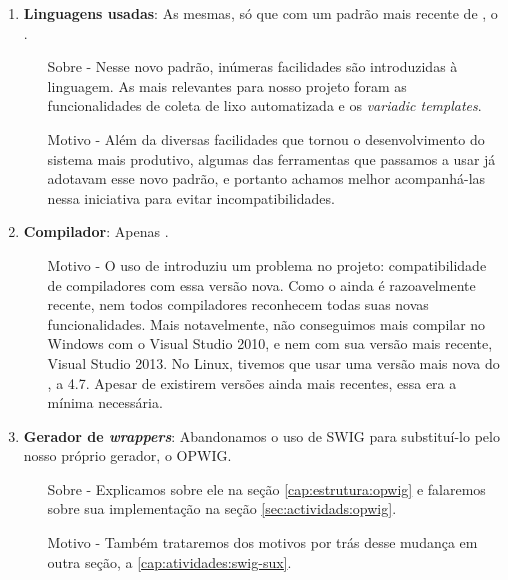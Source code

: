   \begin{enumerate}

    \item \textbf{Linguagens usadas}: As mesmas, só que com um padrão mais
      recente de \CXX{}, o .
      \begin{itemize}
        \item[Sobre -] Nesse novo padrão, inúmeras facilidades são
          introduzidas à linguagem. As mais relevantes para nosso projeto
          foram as funcionalidades de coleta de lixo automatizada e
          os \textit{variadic templates}.
        \item[Motivo -] Além da diversas facilidades que tornou o
          desenvolvimento do sistema mais produtivo, algumas das
          ferramentas que passamos a usar já adotavam esse novo padrão,
          e portanto achamos melhor acompanhá-las nessa iniciativa para
          evitar incompatibilidades.
      \end{itemize}

    \item \textbf{Compilador}: Apenas .
      \begin{itemize}
        \item[Motivo -] O uso de  introduziu um problema no projeto:
          compatibilidade de compiladores com essa versão nova. Como o 
          ainda é razoavelmente recente, nem todos compiladores reconhecem
          todas suas novas funcionalidades. Mais notavelmente, não conseguimos
          mais compilar no Windows com o Visual Studio 2010, e nem com sua
          versão mais recente, Visual Studio 2013. No Linux, tivemos que usar
          uma versão mais nova do , a 4.7. Apesar de existirem
          versões ainda mais recentes, essa era a mínima necessária.
      \end{itemize}

    \item \textbf{Gerador de \textit{wrappers}}: Abandonamos o uso de SWIG
      para substituí-lo pelo nosso próprio gerador, o OPWIG.
      \begin{itemize}
        \item[Sobre -] Explicamos sobre ele na seção \ref{cap:estrutura:opwig}
          e falaremos sobre sua implementação na seção \ref{sec:actividads:opwig}.
        \item[Motivo -] Também trataremos dos motivos por trás desse mudança
          em outra seção, a \ref{cap:atividades:swig-sux}.
      \end{itemize}


\end{enumerate}
